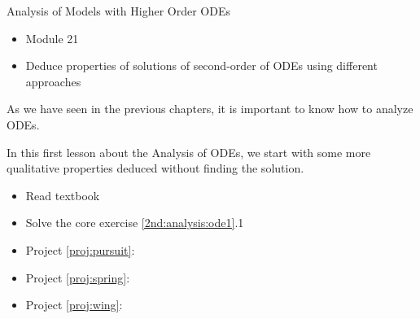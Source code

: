 \standardonlynewpage

%
%



\begin{module}{Analysis of Models with Higher Order ODEs}
	\label{2nd:analysis}

	
	
\end{module}



\begin{lesson}

	\begin{itemize}
		\item Module 21
	\end{itemize}

	\begin{itemize}
		\item Deduce properties of solutions of second-order of ODEs using different approaches
	\end{itemize}
	

As we have seen in the previous chapters, it is important to know how to analyze ODEs.

In this first lesson about the Analysis of ODEs, we start with some more qualitative properties deduced without finding the solution.

\begin{itemize}
	\item Read textbook
	\item Solve the core exercise \ref{2nd:analysis:ode1}.1
\end{itemize}

\begin{itemize}
	\item Project \ref{proj:pursuit}: \pursuittitle
	\item Project \ref{proj:spring}: \springtitle
	\item Project \ref{proj:wing}: \wingtitle
\end{itemize}


\end{lesson}





